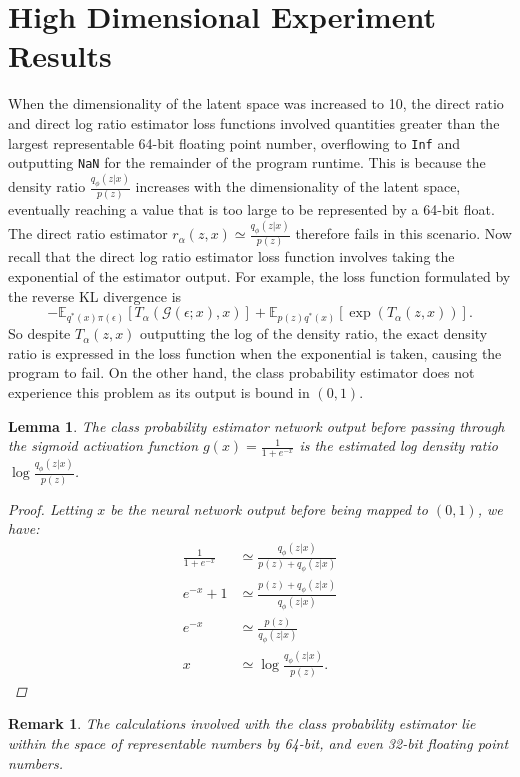 \documentclass[honours,12pt]{unswthesis}
\newcommand{\E}{\mathbb{E}}
\newtheorem{lemma}[theorem]{Lemma}
\newtheorem{remark}[theorem]{Remark}
\numberwithin{equation}{section}
\theoremstyle{definition}
\begin{document}
\section{High Dimensional Experiment Results}
When the dimensionality of the latent space was increased to 10, the direct ratio and direct log ratio estimator loss functions involved quantities greater than the largest representable 64-bit floating point number, overflowing to \verb+Inf+ and outputting \verb+NaN+ for the remainder of the program runtime. This is because the density ratio $\frac{q_\phi(z|x)}{p(z)}$ increases with the dimensionality of the latent space, eventually reaching a value that is too large to be represented by a 64-bit float. The direct ratio estimator $r_\alpha(z,x)\simeq \frac{q_\phi(z|x)}{p(z)}$ therefore fails in this scenario. Now recall that the direct log ratio estimator loss function involves taking the exponential of the estimator output. For example, the loss function formulated by the reverse KL divergence is
\[-\E_{q^*(x)\pi(\epsilon)}[T_\alpha(\mathcal{G}(\epsilon;x),x)]+\E_{p(z)q^*(x)}[\exp(T_\alpha(z,x))].\]
So despite $T_\alpha(z,x)$ outputting the log of the density ratio, the exact density ratio is expressed in the loss function when the exponential is taken, causing the program to fail. On the other hand, the class probability estimator does not experience this problem as its output is bound in $(0,1)$.
\begin{lemma}
The class probability estimator network output before passing through the sigmoid activation function $g(x)=\frac{1}{1+e^{-x}}$ is the estimated log density ratio $\log \frac{q_\phi(z|x)}{p(z)}$.
\begin{proof}
Letting $x$ be the neural network output before being mapped to $(0,1)$, we have:
\begin{align*}
\frac{1}{1+e^{-x}}&\simeq\frac{q_\phi(z|x)}{p(z)+q_\phi(z|x)}\\
e^{-x}+1&\simeq\frac{p(z)+q_\phi(z|x)}{q_\phi(z|x)}\\
e^{-x}&\simeq\frac{p(z)}{q_\phi(z|x)}\\
x&\simeq\log \frac{q_\phi(z|x)}{p(z)}.
\end{align*}
\end{proof}
\end{lemma}
\begin{remark}
The calculations involved with the class probability estimator lie within the space of representable numbers by 64-bit, and even 32-bit floating point numbers.
\end{remark}
\end{document}
